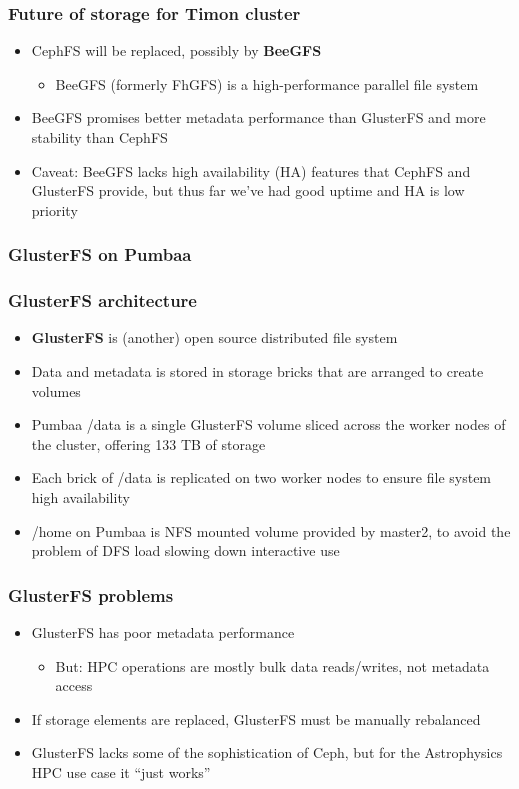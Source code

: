 \documentclass[handout]{beamer}
\begin{document}
\begin{frame}
\frametitle{Future of storage for Timon cluster}
\begin{itemize}
\item CephFS will be replaced, possibly by \textbf{BeeGFS}
\begin{itemize}
\item BeeGFS (formerly FhGFS) is a high-performance parallel file system
\end{itemize}
\item BeeGFS promises better metadata performance than GlusterFS and more stability than CephFS
\item Caveat: BeeGFS lacks high availability (HA) features that CephFS and GlusterFS provide, but thus far we've had good uptime and HA is low priority
\end{itemize}
\end{frame}

\begin{frame}
\frametitle{GlusterFS on Pumbaa}
\end{frame}

\begin{frame}
\frametitle{GlusterFS architecture}
\begin{itemize}
\item \textbf{GlusterFS} is (another) open source distributed file system
\item Data and metadata is stored in storage bricks that are arranged to create volumes
\item Pumbaa /data is a single GlusterFS volume sliced across the worker nodes of the cluster, offering 133 TB of storage
\item Each brick of /data is replicated on two worker nodes to ensure file system high availability
\item /home on Pumbaa is NFS mounted volume provided by master2, to avoid the problem of DFS load slowing down interactive use
\end{itemize}
\end{frame}

\begin{frame}
\frametitle{GlusterFS problems}
\begin{itemize}
\item GlusterFS has poor metadata performance
\begin{itemize}
\item But: HPC operations are mostly bulk data reads/writes, not metadata access
\end{itemize}
\item If storage elements are replaced, GlusterFS must be manually rebalanced
\item GlusterFS lacks some of the sophistication of Ceph, but for the Astrophysics HPC use case it ``just works''
\end{itemize}
\end{frame}
\end{document}
